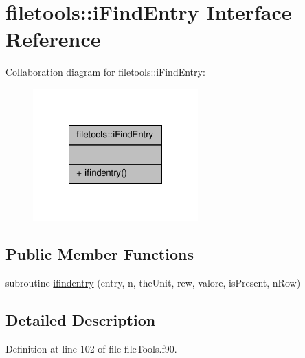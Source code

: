 \hypertarget{interfacefiletools_1_1i_find_entry}{\section{filetools\-:\-:i\-Find\-Entry Interface Reference}
\label{interfacefiletools_1_1i_find_entry}
}


Collaboration diagram for filetools\-:\-:i\-Find\-Entry\-:\nopagebreak
\begin{figure}[H]
\begin{center}
\leavevmode
\includegraphics[width=180pt]{interfacefiletools_1_1i_find_entry__coll__graph}
\end{center}
\end{figure}
\subsection*{Public Member Functions}
\begin{DoxyCompactItemize}
\item 
subroutine \hyperlink{interfacefiletools_1_1i_find_entry_acc5d0e736fc0e81737c4ae294410f3c8}{ifindentry} (entry, n, the\-Unit, rew, valore, is\-Present, n\-Row)
\end{DoxyCompactItemize}


\subsection{Detailed Description}


Definition at line 102 of file file\-Tools.\-f90.



